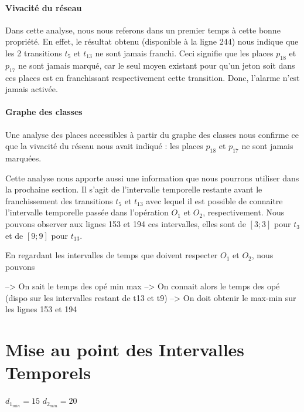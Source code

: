 \paragraph*{Vivacité du réseau} Dans cette analyse, nous nous referons dans un premier temps à cette bonne propriété. En effet, le résultat obtenu (disponible à la ligne 244) nous indique que les 2 transitions $t_5$ et $t_{13}$ ne sont jamais franchi. Ceci signifie que les places $p_{18}$ et $p_{17}$ ne sont jamais marqué, car le seul moyen existant pour qu'un jeton soit dans ces places est en franchissant respectivement cette transition. Donc, l'alarme n'est jamais activée.

\paragraph*{Graphe des classes}Une analyse des places accessibles à partir du graphe des classes nous confirme ce que la vivacité du réseau nous avait indiqué : les places $p_{18}$ et $p_{17}$ ne sont jamais marquées. 

Cette analyse nous apporte aussi une information que nous pourrons utiliser dans la prochaine section. Il s'agit de l'intervalle temporelle restante avant le franchissement des transitions $t_5$ et $t_{13}$ avec lequel il est possible de connaitre l'intervalle temporelle passée dans l'opération $O_1$ et $O_2$, respectivement. Nous pouvons observer aux lignes 153 et 194 ces intervalles, elles sont de $[3;3]$ pour $t_3$ et de $[9;9]$ pour $t_{13}$. 

En regardant les intervalles de temps que doivent respecter $O_1$ et $O_2$, nous pouvons

--> On sait le temps des opé min max
--> On connait alors le temps des opé (dispo sur les intervalles restant de t13 et t9) 
--> On doit obtenir le max-min sur les lignes 153 et 194



\section{Mise au point des Intervalles Temporels}
$d_{1_{min}} = 15$
$d_{2_{min}} = 20$